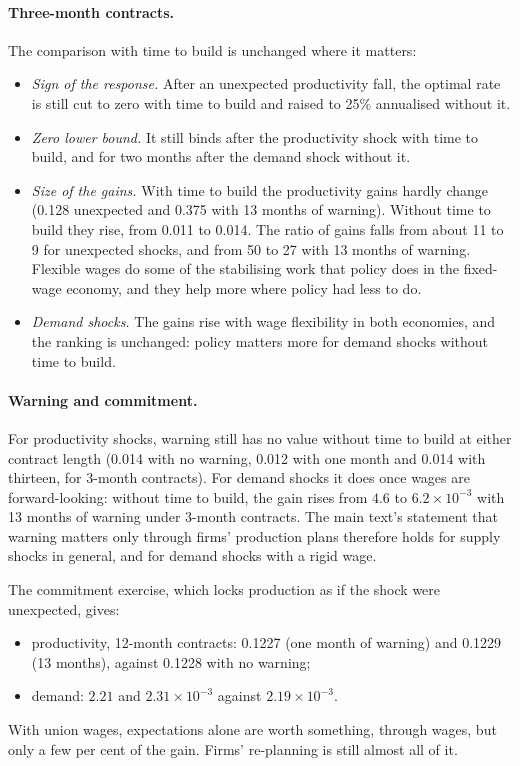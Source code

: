 \documentclass[11pt]{article}
\begin{document}
\paragraph{Three-month contracts.} The comparison with time to build is unchanged where it matters:
\begin{itemize}
  \item \emph{Sign of the response.} After an unexpected productivity fall, the optimal rate is still
        cut to zero with time to build and raised to 25\% annualised without it.
  \item \emph{Zero lower bound.} It still binds after the productivity shock with time to build, and
        for two months after the demand shock without it.
  \item \emph{Size of the gains.} With time to build the productivity gains hardly change (0.128
        unexpected and 0.375 with 13 months of warning). Without time to build they rise, from 0.011 to
        0.014. The ratio of gains falls from about 11 to 9 for unexpected shocks, and from 50 to 27 with
        13 months of warning. Flexible wages do some of the stabilising work that policy does in the
        fixed-wage economy, and they help more where policy had less to do.
  \item \emph{Demand shocks.} The gains rise with wage flexibility in both economies, and the ranking
        is unchanged: policy matters more for demand shocks without time to build.
\end{itemize}

\paragraph{Warning and commitment.} For productivity shocks, warning still has no value without time
to build at either contract length (0.014 with no warning, 0.012 with one month and 0.014 with
thirteen, for 3-month contracts). For demand shocks it does once wages are forward-looking: without time
to build, the gain rises from $4.6$ to $6.2\times10^{-3}$ with 13 months of warning under 3-month
contracts. The main text's statement that warning matters only through firms' production plans
therefore holds for supply shocks in general, and for demand shocks with a rigid wage.

The commitment exercise, which locks production as if the shock were unexpected, gives:
\begin{itemize}
  \item productivity, 12-month contracts: 0.1227 (one month of warning) and 0.1229 (13 months),
        against 0.1228 with no warning;
  \item demand: $2.21$ and $2.31\times10^{-3}$ against $2.19\times10^{-3}$.
\end{itemize}
With union wages, expectations alone are worth something, through wages, but only a few per cent of the
gain. Firms' re-planning is still almost all of it.
\end{document}
